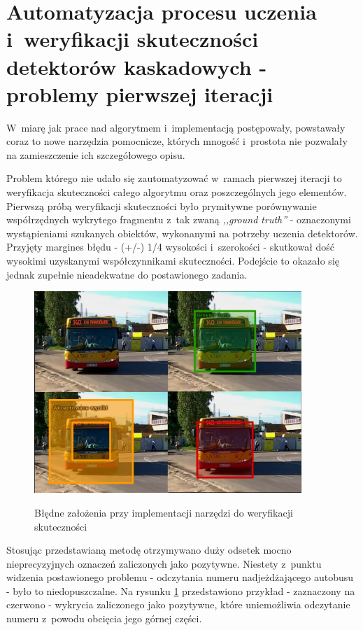 \section{Automatyzacja procesu uczenia i~weryfikacji skuteczności
    detektorów kaskadowych - problemy pierwszej iteracji}

W~miarę jak prace nad algorytmem i~implementacją postępowały, powstawały
coraz to nowe narzędzia pomocnicze, których mnogość i~prostota nie
pozwalały na zamieszczenie ich szczegółowego opisu. 

Problem którego nie udało się zautomatyzować 
w~ramach pierwszej iteracji to weryfikacja skuteczności
całego algorytmu oraz poszczególnych jego elementów. Pierwszą
próbą weryfikacji skuteczności było prymitywne porównywanie współrzędnych
wykrytego fragmentu z~tak zwaną \textit{,,ground truth''} - oznaczonymi
wystąpieniami szukanych obiektów, wykonanymi na potrzeby uczenia 
detektorów. 
Przyjęty margines błędu - (+/-) 1/4 wysokości i~szerokości - skutkował dość
wysokimi uzyskanymi współczynnikami skuteczności. Podejście to okazało
się jednak zupełnie nieadekwatne do postawionego zadania.

\begin{figure}[h!]
    \caption{Błędne założenia przy implementacji narzędzi do
    weryfikacji skuteczności}
    \centering
    \includegraphics[width=0.9\textwidth]{img/env_benchmark_fail_1}
    \label{fig:autoverificationfail}
\end{figure}

Stosując przedstawianą metodę otrzymywano 
duży odsetek mocno nieprecyzyjnych oznaczeń
zaliczonych jako pozytywne. Niestety
z~punktu widzenia postawionego problemu -
odczytania numeru nadjeżdżającego autobusu - 
było to niedopuszczalne. Na rysunku 
\ref{fig:autoverificationfail} przedstawiono przykład - 
zaznaczony na czerwono - wykrycia zaliczonego
jako pozytywne, które uniemożliwia odczytanie numeru z~powodu obcięcia
jego górnej części.

